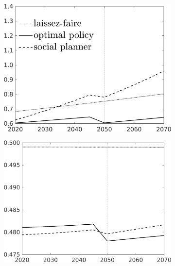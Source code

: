\begin{figure}[h!!]
	\centering
	\caption{Laissez-faire, optimal, and efficient allocation in levels: no knowledge spillovers }\label{fig:LF_noKN}	
		\begin{subfigure}[]{0.32\textwidth}
			\includegraphics[width=1\textwidth]{../../codding_model/own_basedOnFried/optimalPol_010922_revision/figures/all_13Sept22_Tplus30/C_CompEffOPT_T_NoTaus_regime4_opteff_knspil1_spillover0_noskill0_sep0_xgrowth0_countec0_PV1_etaa0.79_lgd1_lff1.png}
		\end{subfigure}	
		\begin{subfigure}[]{0.32\textwidth}
			\includegraphics[width=1\textwidth]{../../codding_model/own_basedOnFried/optimalPol_010922_revision/figures/all_13Sept22_Tplus30/hh_CompEffOPT_T_NoTaus_regime4_opteff_knspil1_spillover0_noskill0_sep0_xgrowth0_countec0_PV1_etaa0.79_lgd0_lff1.png}

\end{subfigure}
\end{figure}
